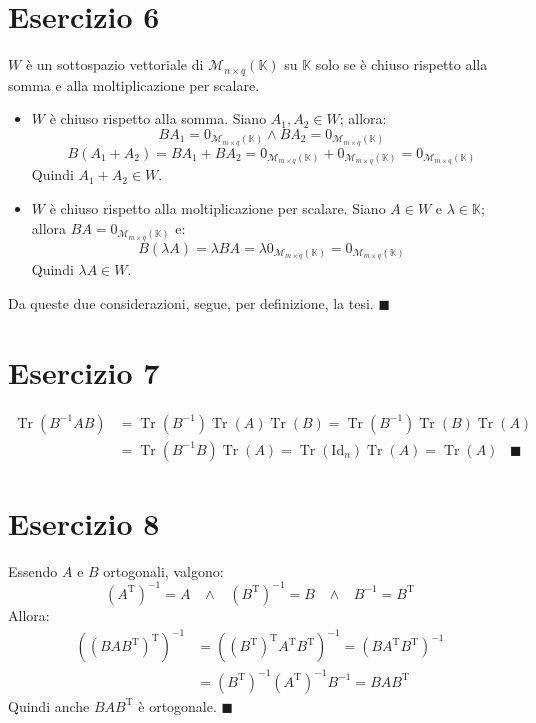 \documentclass{article}
\newcommand*{\qed}{\blacksquare}
\newcommand*{\M}[3]{\mathcal{M}_{#1\times#2} \left(#3\right)}
\newcommand*{\MK}[2]{\M{#1}{#2}{\mathbb{K}}}
\newcommand*{\T}[1]{{#1}^\text{T}}  %
\DeclareMathOperator{\Tr}{Tr}  %
\begin{document}
\section*{Esercizio 6}
$W$ è un sottospazio vettoriale di $\MK{n}{q}$ su $\mathbb{K}$ solo se
è chiuso rispetto alla somma e alla moltiplicazione per scalare.
\begin{itemize}
    \item $W$ è chiuso rispetto alla somma. Siano $A_1,A_2\in W$; allora:
    \[BA_1=0_{\MK{m}{q}} \wedge BA_2=0_{\MK{m}{q}}\]
    \[B(A_1 + A_2) = BA_1 + BA_2 = 0_{\MK{m}{q}} + 0_{\MK{m}{q}} = 0_{\MK{m}{q}}\]
    Quindi $A_1 + A_2 \in W$.
    \item $W$ è chiuso rispetto alla moltiplicazione per scalare.
    Siano $A\in W$ e $\lambda\in\mathbb{K}$; allora $BA=0_{\MK{m}{q}}$ e:
    \[B(\lambda A)=\lambda BA = \lambda 0_{\MK{m}{q}} = 0_{\MK{m}{q}}\]
    Quindi $\lambda A \in W$.
\end{itemize}
Da queste due considerazioni, segue, per definizione, la tesi. $\qed$

\section*{Esercizio 7}
\[\begin{aligned}
    \Tr(B^{-1} A B) &=
    \Tr(B^{-1})\Tr(A)\Tr(B) =
    \Tr(B^{-1})\Tr(B)\Tr(A) \\ &=
    \Tr(B^{-1} B)\Tr(A) =
    \Tr(\text{Id}_n)\Tr(A) =
    \Tr(A)\hspace{10pt}\qed
\end{aligned}\]

\section*{Esercizio 8}
Essendo $A$ e $B$ ortogonali, valgono:
\[
    \left(A^\text{T}\right)^{-1}=A
    \hspace{10pt}\wedge\hspace{10pt}
    \left(B^\text{T}\right)^{-1}=B
    \hspace{10pt}\wedge\hspace{10pt}
    B^{-1}=B^\text{T}
\]
Allora:
\[\begin{aligned}
    \left(\T{\left(BA\T{B}\right)}\right)^{-1} &=
    \left(\T{\left(\T{B}\right)}\T{A}\T{B}\right)^{-1} =
    \left(B\T{A}\T{B}\right)^{-1} \\ &=
    \left(\T{B}\right)^{-1}\left(\T{A}\right)^{-1}B^{-1} =
    BA\T{B}
\end{aligned}\]
Quindi anche $BA\T{B}$ è ortogonale. $\qed$
\end{document}

